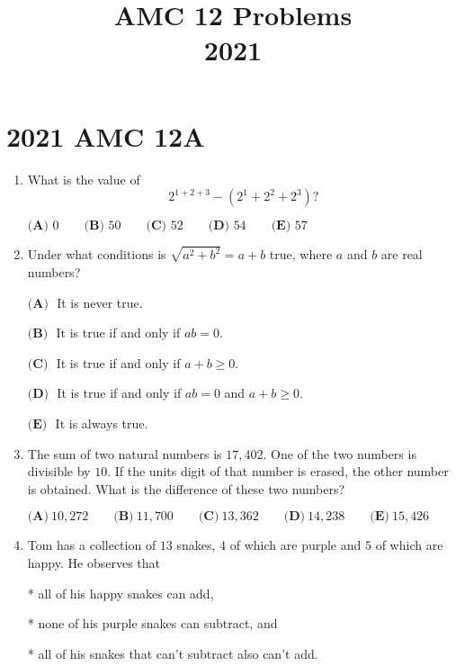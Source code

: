 \documentclass{article}
\title{AMC 12 Problems \\ 2021}
\date{}
\begin{document}
\maketitle\thispagestyle{fancy}\newpage\section*{2021 AMC 12A}
\begin{enumerate}[label=\arabic*., itemsep=0.5em]
\item What is the value of
\begin{equation*}
2^{1+2+3}-(2^1+2^2+2^3)?
\end{equation*}

\(\textbf{(A) }0 \qquad \textbf{(B) }50 \qquad \textbf{(C) }52 \qquad \textbf{(D) }54 \qquad \textbf{(E) }57\)\par \vspace{0.5em}\item Under what conditions is \(\sqrt{a^2+b^2}=a+b\) true, where \(a\) and \(b\) are real numbers?

\(\textbf{(A) }\) It is never true.

\(\textbf{(B) }\) It is true if and only if \(ab=0\).

\(\textbf{(C) }\) It is true if and only if \(a+b\ge 0\).

\(\textbf{(D) }\) It is true if and only if \(ab=0\) and \(a+b\ge 0\).

\(\textbf{(E) }\) It is always true.\par \vspace{0.5em}\item The sum of two natural numbers is \(17{,}402\). One of the two numbers is divisible by \(10\). If the units digit of that number is erased, the other number is obtained. What is the difference of these two numbers?

\(\textbf{(A)} ~10{,}272\qquad\textbf{(B)} ~11{,}700\qquad\textbf{(C)} ~13{,}362\qquad\textbf{(D)} ~14{,}238\qquad\textbf{(E)} ~15{,}426\)\par \vspace{0.5em}\item Tom has a collection of \(13\) snakes, \(4\) of which are purple and \(5\) of which are happy. He observes that

* all of his happy snakes can add,

* none of his purple snakes can subtract, and

* all of his snakes that can't subtract also can't add.


\end{enumerate}
\end{document}
